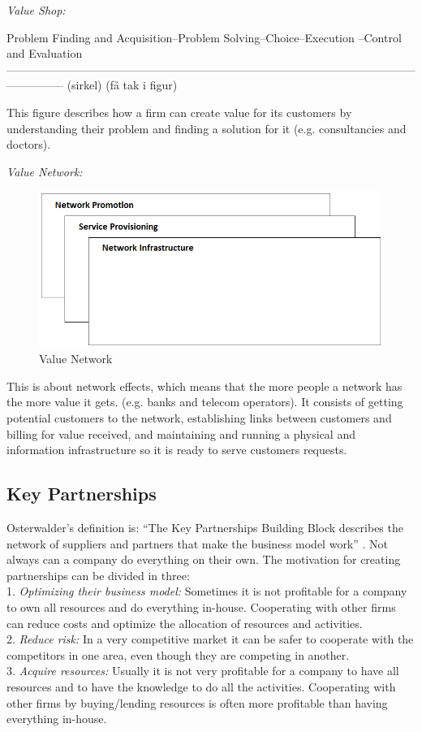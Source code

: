 \bigskip

\emph{Value Shop:}

Problem Finding and Acquisition--Problem Solving--Choice--Execution --Control and Evaluation
---------------------------------------------------------------------------------------------------------------------------
(sirkel) (få tak i figur)

This figure describes how a firm can create value for its customers by understanding their problem and finding a solution for it (e.g. consultancies and doctors).

\bigskip

\emph{Value Network:}

\begin{figure}
\caption[ValueNetwork]{Value Network \cite{osterwalderthesis}}
\label{fig:ValueNetwork}
\begin{center}
\includegraphics[scale=0.5]{valuenetwork}
\end{center}
\end{figure}

This is about network effects, which means that the more people a network has the more value it gets. (e.g. banks and telecom operators). It consists of getting potential customers to the network, establishing links between customers and billing for value received, and maintaining and running a physical and information infrastructure so it is ready to serve customers requests. 
\newpage
\subsection{Key Partnerships}
Osterwalder’s definition is: “The Key Partnerships Building Block describes the network of suppliers and partners that make the business model work” \cite{osterwalder}. Not always can a company do everything on their own. The motivation for creating partnerships can be divided in three: 
\\
1. \emph{Optimizing their business model:} Sometimes it is not profitable for a company to own all resources and do everything in-house. Cooperating with other firms can reduce costs and optimize the allocation of resources and activities. 
\\
2. \emph{Reduce risk:} In a very competitive market it can be safer to cooperate with the competitors in one area, even though they are competing in another.
\\
3. \emph{Acquire resources:} Usually it is not very profitable for a company to have all resources and to have the knowledge to do all the activities. Cooperating with other firms by buying/lending resources is often more profitable than having everything in-house. 

